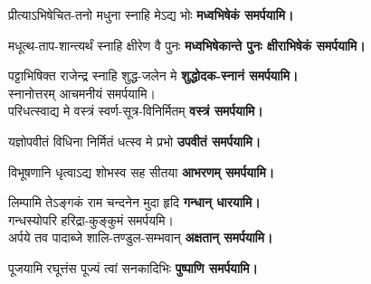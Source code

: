 \begin{center}
{प्रीत्याऽभिषेचित-तनो मधुना स्नाहि मेऽद्य भोः}
\textbf{\devAya{} मध्वभिषेकं समर्पयामि।\\}

{मधूत्थ-ताप-शान्त्यर्थं स्नाहि क्षीरेण वै पुनः}
\textbf{\devAya{} मध्वभिषेकान्ते पुनः क्षीराभिषेकं समर्पयामि।\\}

{पट्टाभिषिक्त राजेन्द्र स्नाहि शुद्ध-जलेन मे}
\textbf{\devAya{} शुद्धोदक-स्नानं समर्पयामि।\\}
स्नानोत्तरम् आचमनीयं समर्पयामि।\\

{परिधत्स्वाद्य मे वस्त्रं स्वर्ण-सूत्र-विनिर्मितम्}
\textbf{\devAya{} वस्त्रं समर्पयामि।\\}

{यज्ञोपवीतं विधिना निर्मितं धत्स्व मे प्रभो}
\textbf{\devAya{} उपवीतं समर्पयामि।\\}

{विभूषणानि धृत्वाऽद्य शोभस्व सह सीतया}
\textbf{\devAya{} आभरणम् समर्पयामि।\\}

{लिम्पामि तेऽङ्गकं राम चन्दनेन मुदा हृदि}
\textbf{\devAya{} गन्धान् धारयामि।\\}
गन्धस्योपरि हरिद्रा-कुङ्कुमं समर्पयमि।\\

{अर्पये तव पादाब्जे शालि-तण्डुल-सम्भवान्}
\textbf{\devAya{} अक्षतान् समर्पयामि।\\}

{पूजयामि रघूत्तंस पूज्यं त्वां सनकादिभिः}
\textbf{\devAya{} पुष्पाणि समर्पयामि।}


\end{center}
